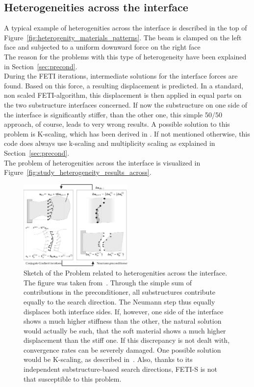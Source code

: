 \subsection{Heterogeneities across the interface}\label{sec:heterogeneities_across}
A typical example of heterogenities across the interface is described in the top of Figure~\ref{fig:heterogenity_materials_patterns}. The beam is clamped on the left face and subjected to a uniform downward force on the right face\\
The reason for the problems with this type of heterogeneity have been explained in Section~\ref{sec:precond}.\\
During the FETI iterations, intermediate solutions for the interface forces are found. Based on this force, a resulting displacement is predicted. In a standard, non scaled FETI-algorithm, this displacement is then applied in equal parts on the two substructure interfaces concerned. If now the substructure on one side of the interface is significantly stiffer, than the other one, this simple 50/50 approach, of course, leads to very wrong results. A possible solution to this problem is K-scaling, which has been derived in \cite{Farhat1995}. If not mentioned otherwise, this code does always use k-scaling and multiplicity scaling as explained in Section~\ref{sec:precond}.\\
The problem of heterogenities across the interface is visualized in Figure~\ref{fig:study_heterogeneity_results_across}.

\begin{figure}[tb]
  \begin{center}
    \includegraphics[width=0.5\textwidth]{./fig/pdf/problem_heterogenity.pdf}
    \caption[Study of heterogeneities across the interface: problem sketch]{Sketch of the Problem related to heterogenities across the interface. The figure was taken from~\cite{Rixen2013}. Through the simple sum of contributions in the preconditioner, all substructures contribute equally to the search direction. The Neumann step thus equally displaces both interface sides. If, however, one side of the interface shows a much higher stiffness than the other, the natural solution would actually be such, that the soft material shows a much higher displacement than the stiff one. If this discrepancy is not dealt with, convergence rates can be severely damaged. One possible solution would be K-scaling, as described in~\cite{Rixen1999a}. Also, thanks to its independent substructure-based search directions, FETI-S is not that susceptible to this problem.}
    \label{fig:problem_heterogenity_sketch}
  \end{center}
\end{figure}



